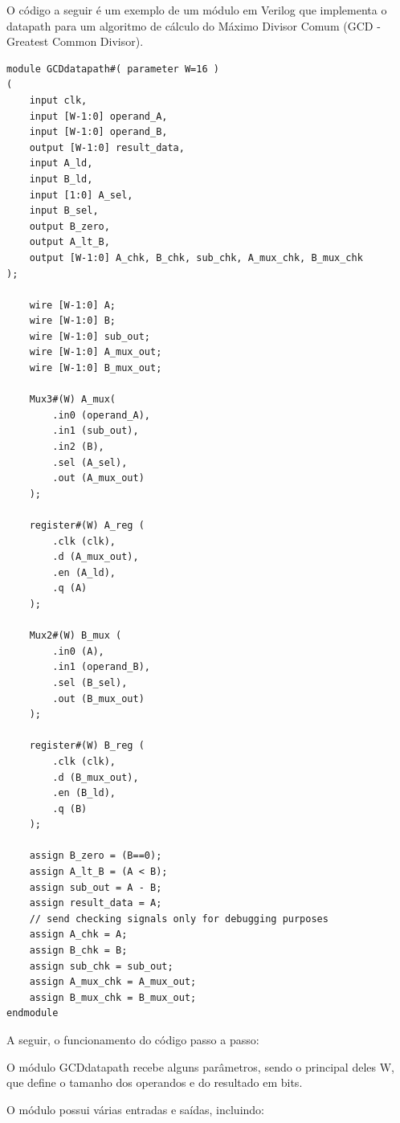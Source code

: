 \documentclass[a4paper,11pt]{article} %
\begin{document}
O código a seguir é um exemplo de um módulo em Verilog
que implementa o datapath para um algoritmo de cálculo do
Máximo Divisor Comum (GCD - Greatest Common Divisor).

\begin{verbatim}
module GCDdatapath#( parameter W=16 )
(
    input clk,
    input [W-1:0] operand_A,
    input [W-1:0] operand_B,
    output [W-1:0] result_data,
    input A_ld,
    input B_ld,
    input [1:0] A_sel,
    input B_sel,
    output B_zero,
    output A_lt_B,
    output [W-1:0] A_chk, B_chk, sub_chk, A_mux_chk, B_mux_chk
);

    wire [W-1:0] A;
    wire [W-1:0] B;
    wire [W-1:0] sub_out;
    wire [W-1:0] A_mux_out;
    wire [W-1:0] B_mux_out;

    Mux3#(W) A_mux(
        .in0 (operand_A),
        .in1 (sub_out),
        .in2 (B),
        .sel (A_sel),
        .out (A_mux_out) 
    );

    register#(W) A_reg (
        .clk (clk),
        .d (A_mux_out),
        .en (A_ld),
        .q (A) 
    );

    Mux2#(W) B_mux (
        .in0 (A),
        .in1 (operand_B),
        .sel (B_sel),
        .out (B_mux_out) 
    );

    register#(W) B_reg (
        .clk (clk),
        .d (B_mux_out),
        .en (B_ld),
        .q (B) 
    );

    assign B_zero = (B==0);
    assign A_lt_B = (A < B);
    assign sub_out = A - B;
    assign result_data = A;
    // send checking signals only for debugging purposes
    assign A_chk = A;
    assign B_chk = B;
    assign sub_chk = sub_out;
    assign A_mux_chk = A_mux_out;
    assign B_mux_chk = B_mux_out;
endmodule
\end{verbatim}


A seguir, o funcionamento do código passo a passo:

O módulo GCDdatapath recebe alguns parâmetros,
sendo o principal deles W,
que define o tamanho dos operandos e do resultado em bits.

O módulo possui várias entradas e saídas, incluindo:
\end{document}
